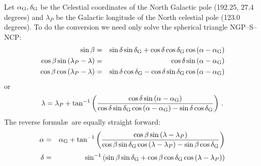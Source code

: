 Let $\alpha_{\hbox{\scriptsize G}},\delta_{\hbox{\scriptsize G}}$ be the Celestial coordinates of the North
Galactic pole (192.25, 27.4 degrees) and $\lambda_P$ be the Galactic
longitude of the North celestial pole (123.0 degrees).  To do the
conversion we need only solve the spherical triangle NGP--S--NCP:
\begin{eqnarray}
 \sin\beta & = &\sin\delta\sin\delta_{\hbox{\scriptsize G}} + \cos\delta\cos\delta_{\hbox{\scriptsize G}}
                \cos\,(\alpha-\alpha_{\hbox{\scriptsize G}}) \nonumber \\
  \cos\beta\sin\,(\lambda_P-\lambda) & = &\cos\delta\sin\,(\alpha -
                \alpha_{\hbox{\scriptsize G}})  \label{eq:blgal} \\
  \cos\beta\cos\,(\lambda_P-\lambda) & = &\sin\delta\cos\delta_{\hbox{\scriptsize G}} -
                \cos\delta\sin\delta_{\hbox{\scriptsize G}}\cos\,(\alpha-\alpha_{\hbox{\scriptsize G}})
\end{eqnarray}
or
\begin{displaymath}
  \lambda = \lambda_P + \tan^{-1}\left( \frac{\cos\delta\sin\,
            (\alpha-\alpha_{\hbox{\scriptsize G}})}{\cos\delta\sin\delta_{\hbox{\scriptsize G}}\cos\,
            (\alpha-\alpha_{\hbox{\scriptsize G}}) - \sin\delta\cos\delta_{\hbox{\scriptsize G}}} \right) \, .
\end{displaymath}
The reverse formul\ae\ are equally straight forward:
\begin{eqnarray*}
  \alpha & = &\alpha_\G + \tan^{-1}\left( \frac{\cos\beta\sin\,
      (\lambda-\lambda_P)}{\cos\beta\sin\delta_\G\cos\,
      (\lambda-\lambda_P) - \sin\beta\cos\delta_\G}\right) \\
 \noalign{\vskip 3pt}
  \delta & = &\sin^{-1} \left(\sin\beta\sin\delta_\G +
      \cos\beta\cos\delta_\G\cos\,(\lambda-\lambda_P)\right)
\end{eqnarray*}

